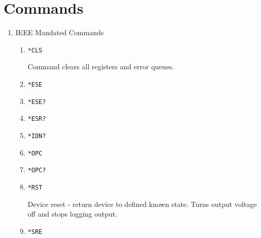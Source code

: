 \documentclass[a4paper,10pt]{article}
\begin{document}
\section{Commands}

\begin{enumerate}
\item IEEE Mandated Commands
    \begin{enumerate}
        \item \hypertarget{cls}{} 
            \begin{verbatim}*CLS\end{verbatim}
            \begin{description}
                Command clears all registers and error queues.
            \end{description}
        \item \begin{verbatim}*ESE\end{verbatim}
		\item \begin{verbatim}*ESE?\end{verbatim}
		\item \begin{verbatim}*ESR?\end{verbatim}
		\item \begin{verbatim}*IDN?\end{verbatim}
		\item \begin{verbatim}*OPC\end{verbatim}
		\item \begin{verbatim}*OPC?\end{verbatim}
        \item \begin{verbatim}*RST\end{verbatim}
            \begin{description}
                Device reset - return device to defined known state. Turns output voltage off and stops logging output.
            \end{description}
        \item \begin{verbatim}*SRE\end{verbatim}

\end{enumerate}
\end{enumerate}
\end{document}
